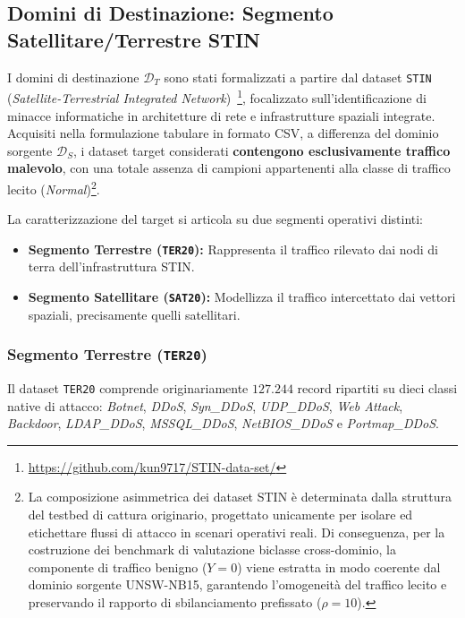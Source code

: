 \subsection{Domini di Destinazione: Segmento Satellitare/Terrestre STIN}
\label{subsec:dataset_target}

I domini di destinazione $\mathcal{D}_T$ sono stati formalizzati a partire dal dataset \texttt{STIN} (\textit{Satellite-Terrestrial Integrated Network})~\cite{stin}\footnote{\url{https://github.com/kun9717/STIN-data-set/}}, focalizzato sull'identificazione di minacce informatiche in architetture di rete e infrastrutture spaziali integrate. 
Acquisiti nella formulazione tabulare in formato CSV, a differenza del dominio sorgente $\mathcal{D}_S$, i dataset target considerati \textbf{contengono esclusivamente traffico malevolo}, con una totale assenza di campioni appartenenti alla classe di traffico lecito (\textit{Normal})\footnote{La composizione asimmetrica dei dataset STIN è determinata dalla struttura del testbed di cattura originario, progettato unicamente per isolare ed etichettare flussi di attacco in scenari operativi reali. Di conseguenza, per la costruzione dei benchmark di valutazione biclasse cross-dominio, la componente di traffico benigno ($Y=0$) viene estratta in modo coerente dal dominio sorgente UNSW-NB15, garantendo l'omogeneità del traffico lecito e preservando il rapporto di sbilanciamento prefissato ($\rho = 10$).}.

La caratterizzazione del target si articola su due segmenti operativi distinti:
\begin{itemize}
    \item \textbf{Segmento Terrestre (\texttt{TER20}):} Rappresenta il traffico rilevato dai nodi di terra dell'infrastruttura STIN.
    \item \textbf{Segmento Satellitare (\texttt{SAT20}):} Modellizza il traffico intercettato dai vettori spaziali, precisamente quelli satellitari.
\end{itemize}

\subsubsection{Segmento Terrestre (\texttt{TER20})}
Il dataset \texttt{TER20} comprende originariamente $127.244$ record ripartiti su dieci classi native di attacco: \textit{Botnet}, \textit{DDoS}, \textit{Syn\_DDoS}, \textit{UDP\_DDoS}, \textit{Web Attack}, \textit{Backdoor}, \textit{LDAP\_DDoS}, \textit{MSSQL\_DDoS}, \textit{NetBIOS\_DDoS} e \textit{Portmap\_DDoS}.


